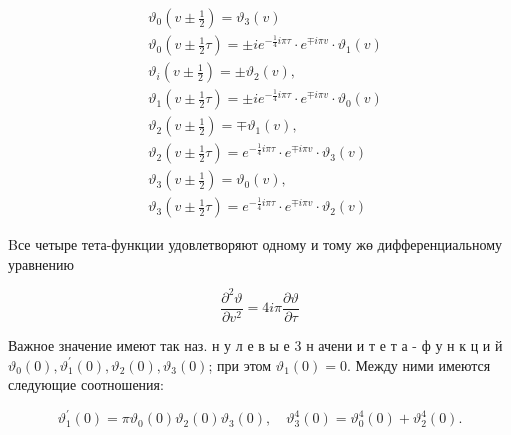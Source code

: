 \documentclass[10pt]{article}
\begin{document}
\[

\begin{aligned}

& \vartheta_{0}\left(v \pm \frac{1}{2}\right)=\vartheta_{3}(v) \\

& \vartheta_{0}\left(v \pm \frac{1}{2} \tau\right)= \pm i e^{-\frac{1}{4} i \pi \tau} \cdot e^{\mp i \pi v} \cdot \vartheta_{1}(v) \\

& \vartheta_{i}\left(v \pm \frac{1}{2}\right)= \pm \vartheta_{2}(v), \\

& \vartheta_{1}\left(v \pm \frac{1}{2} \tau\right)= \pm i e^{-\frac{1}{4} i \pi \tau} \cdot e^{\mp i \pi v} \cdot \vartheta_{0}(v) \\

& \vartheta_{2}\left(v \pm \frac{1}{2}\right)=\mp \vartheta_{1}(v), \\

& \vartheta_{2}\left(v \pm \frac{1}{2} \tau\right)=e^{-\frac{1}{4} i \pi \tau} \cdot e^{\mp i \pi v} \cdot \vartheta_{3}(v) \\

& \vartheta_{3}\left(v \pm \frac{1}{2}\right)=\vartheta_{0}(v), \\

& \vartheta_{3}\left(v \pm \frac{1}{2} \tau\right)=e^{-\frac{1}{4} i \pi \tau} \cdot e^{\mp i \pi v} \cdot \vartheta_{2}(v)

\end{aligned}

\]



Bсе четыре тета-функции удовлетворяют одному и тому жө дифференциальному уравнению



\[

\frac{\partial^{2} \vartheta}{\partial v^{2}}=4 i \pi \frac{\partial \vartheta}{\partial \tau}

\]



Важное значение имеют так наз. н у л е в ы е 3 н ачени и т е т а - ф у н к ц и й $\vartheta_{0}(0), \vartheta_{1}^{\prime}(0), \vartheta_{2}(0), \vartheta_{3}(0)$; при этом $\vartheta_{1}(0)=0$. Между ними имеются следующие соотношения:



\[

\vartheta_{1}^{\prime}(0)=\pi \vartheta_{0}(0) \vartheta_{2}(0) \vartheta_{3}(0), \quad \vartheta_{3}^{4}(0)=\vartheta_{0}^{4}(0)+\vartheta_{2}^{4}(0) .

\]
\end{document}
